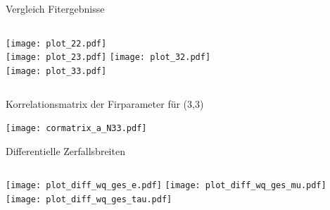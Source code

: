\documentclass[fleqn, aspectratio=1610, professionalfonts, 9pt]{beamer}
\begin{document}
\begin{frame}{Vergleich Fitergebnisse}
  \begin{columns}[t]
    \centering
    \texttt{[image: plot\_22.pdf]}\\
    \texttt{[image: plot\_23.pdf]}
    \centering
    \texttt{[image: plot\_32.pdf]}\\
    \texttt{[image: plot\_33.pdf]}
  \end{columns}
\end{frame}

\begin{frame}{Korrelationsmatrix der Firparameter für (3,3)}
  \begin{center}
      \texttt{[image: cormatrix\_a\_N33.pdf]}
  \end{center}
\end{frame}

\begin{frame}{Differentielle Zerfallsbreiten}
  \begin{columns}[t]
    \column{\textwidth}
    \centering
    \texttt{[image: plot\_diff\_wq\_ges\_e.pdf]}
    \texttt{[image: plot\_diff\_wq\_ges\_mu.pdf]}
    \texttt{[image: plot\_diff\_wq\_ges\_tau.pdf]}
  \end{columns}
\end{frame}
\end{document}
